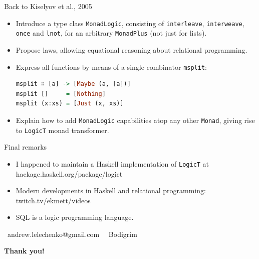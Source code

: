 \documentclass[handout]{beamer}
\begin{document}
\begin{frame}[fragile]{Back to Kiselyov et al., 2005}

\begin{itemize}[<+->]
\item Introduce a type class {\tt MonadLogic}, consisting of
      {\tt interleave}, {\tt interweave}, {\tt once} and {\tt lnot},
      for an arbitrary {\tt MonadPlus} (not just for lists).
\item Propose laws, allowing equational reasoning
      about relational programming.
\item Express all functions by means of a single combinator {\tt msplit}:
\begin{lstlisting}[language=Haskell]
msplit ∷ [a] -> [Maybe (a, [a])]
msplit []     = [Nothing]
msplit (x:xs) = [Just (x, xs)]
\end{lstlisting}

\item Explain how to add {\tt MonadLogic} capabilities atop any other {\tt Monad},
      giving rise to {\tt LogicT} monad transformer.

\end{itemize}

\end{frame}

\begin{frame}{Final remarks}

\begin{itemize}[<+->]
\item I happened to maintain a Haskell implementation of {\tt LogicT}
      at hackage.haskell.org/package/logict
\item Modern developments in Haskell and relational programming:
      twitch.tv/ekmett/videos
\item SQL is a logic programming language.
\end{itemize}

\bigskip
\bigskip
\bigskip

\par \faAt\ andrew.lelechenko@gmail.com
\hspace{7.5em}
\faGithub\ \faTelegram\ Bodigrim

\bigskip
\bigskip
\bigskip

\centerline{\Huge\bf Thank you!}
\end{frame}
\end{document}
